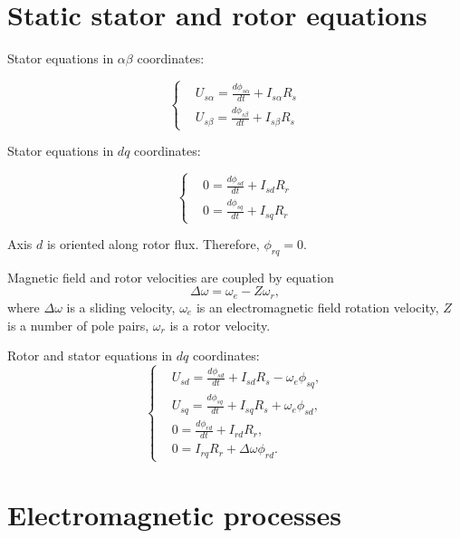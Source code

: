 \documentclass[11pt,a4paper,oneside]{report}
\begin{document}
\section{Static stator and rotor equations}
Stator equations in $\alpha\beta$ coordinates:

\begin{equation}
	\left\{
		\begin{split}
			& U_{s\alpha} = \frac{d\phi_{s\alpha}}{dt}+I_{s\alpha}R_s\\
			& U_{s\beta} = \frac{d\phi_{s\beta}}{dt}+I_{s\beta}R_s
		\end{split}
	\right.
\end{equation}

Stator equations in $dq$ coordinates:

\begin{equation}
	\left\{
	\begin{split}
		& 0 = \frac{d\phi_{sd}}{dt}+I_{sd}R_r\\
		& 0 = \frac{d\phi_{sq}}{dt}+I_{sq}R_r
	\end{split}
	\right.
\end{equation}

Axis $d$ is oriented along rotor flux. Therefore, $\phi_{rq} = 0$.

Magnetic field  and rotor velocities are coupled by equation
\begin{equation}
	\Delta\omega = \omega_e-Z\omega_r,
\end{equation}
where $\Delta\omega$ is a sliding velocity, $\omega_e$ is an electromagnetic field rotation velocity, $Z$ is a number of pole pairs, $\omega_r$ is a rotor velocity.

Rotor and stator equations in $dq$ coordinates:
\begin{equation}
	\label{rs-dq}
	\left\{
	\begin{split}
		& U_{sd} = \frac{d\phi_{sd}}{dt}+I_{sd}R_s-\omega_e\phi_{sq},\\
		& U_{sq} = \frac{d\phi_{sq}}{dt}+I_{sq}R_s+\omega_e\phi_{sd},\\
		& 0 = \frac{d\phi_{rd}}{dt}+I_{rd}R_r,\\
		& 0 = I_{rq}R_r + \Delta\omega\phi_{rd}.
	\end{split}
	\right.
\end{equation}

\section{Electromagnetic processes}
\end{document}

